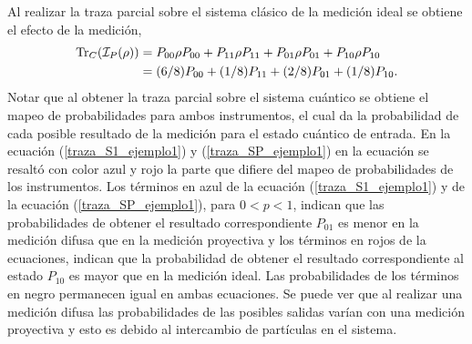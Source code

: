 Al realizar la traza parcial sobre el sistema clásico de la medición ideal se obtiene el efecto de la medición,\begin{equation}\label{traza_AP_ejemploP}\begin{split}
       {\rm Tr}_C(\mathcal{I}_P(\rho)) &= P_{00} \rho P_{00} + P_{11}\rho P_{11}+ P_{01}\rho P_{01}+P_{10}\rho P_{10}\\
      &=(6/8)P_{00} + (1/8)P_{11}+(2/8) P_{01}+ (1/8)P_{10}.\\
 \end{split}
\end{equation}
Notar que al obtener la traza parcial sobre el sistema cuántico se obtiene el
mapeo de probabilidades para ambos instrumentos, el cual da la probabilidad de
cada posible resultado de la medición para el estado cuántico de entrada. En la
ecuación ({\ref{traza_S1_ejemplo1}})  y ({\ref{traza_SP_ejemplo1}}) en la ecuación
se resaltó con color azul y rojo la parte que difiere del mapeo de
probabilidades de los instrumentos. Los términos en azul de la ecuación
({\ref{traza_S1_ejemplo1}}) y de la ecuación ({\ref{traza_SP_ejemplo1}}), para
$0<p<1$, indican que las probabilidades de obtener el resultado correspondiente
$P_{01}$ es menor en la medición difusa que en la medición proyectiva y los
términos en rojos de la ecuaciones, indican que la probabilidad de obtener el
resultado correspondiente al estado $P_{10}$ es mayor que en la medición
ideal. Las probabilidades de los términos en negro permanecen igual en ambas
ecuaciones.  Se puede ver que al realizar una medición difusa las
probabilidades de las posibles salidas varían con una medición proyectiva y
esto es debido al intercambio de partículas en el sistema. 







